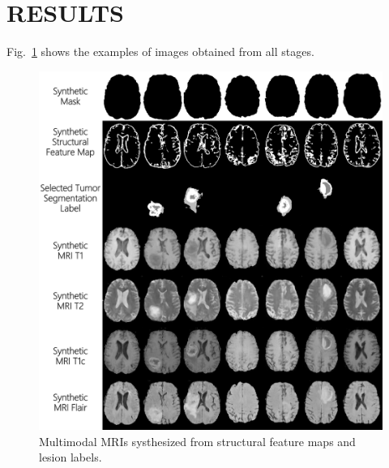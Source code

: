 \documentclass{ecai}
\begin{document}
\section{RESULTS}

Fig.~\ref{generated_mri} shows the examples of images obtained from all stages.
\begin{figure}
	\centering
	\includegraphics[width=0.98\linewidth]{figures/F_to_MRI}
	\caption{Multimodal MRIs systhesized from structural feature maps and lesion labels.}
	\label{generated_mri}
\end{figure}
\end{document}
